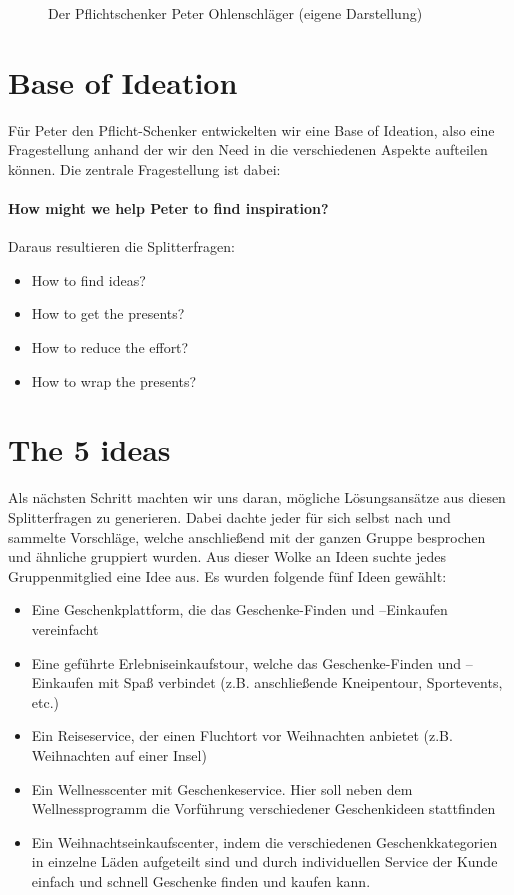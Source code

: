 \documentclass[12pt,ngerman, fleqn]{book} %
\begin{document}
\begin{figure}[ht]
    \centering
    \caption{Der Pflichtschenker Peter Ohlenschläger (eigene Darstellung)}
    \label{fig:peter}
\end{figure}

\section{Base of Ideation}
Für Peter den Pflicht-Schenker entwickelten wir eine Base of Ideation, also eine Fragestellung anhand der wir den Need in die verschiedenen Aspekte aufteilen können. Die zentrale Fragestellung ist dabei:

\paragraph{How might we help Peter to find inspiration?}

Daraus resultieren die Splitterfragen:
\begin{itemize}
    \item How to find ideas?
    \item How to get the presents?
    \item How to reduce the effort?
    \item How to wrap the presents?
\end{itemize}

\section{The 5 ideas}
Als nächsten Schritt machten wir uns daran, mögliche Lösungsansätze aus diesen Splitterfragen zu generieren. Dabei dachte jeder für sich selbst nach und sammelte Vorschläge, welche anschließend mit der ganzen Gruppe besprochen und ähnliche gruppiert wurden. Aus dieser Wolke an Ideen suchte jedes Gruppenmitglied eine Idee aus. Es wurden folgende fünf Ideen gewählt:

\begin{itemize}
    \item Eine Geschenkplattform, die das Geschenke-Finden und –Einkaufen vereinfacht
    \item Eine geführte Erlebniseinkaufstour, welche das Geschenke-Finden und –Einkaufen mit Spaß verbindet (z.B. anschließende Kneipentour, Sportevents, etc.)
    \item Ein Reiseservice, der einen Fluchtort vor Weihnachten anbietet (z.B. Weihnachten auf einer Insel)
    \item Ein Wellnesscenter mit Geschenkeservice. Hier soll neben dem Wellnessprogramm die Vorführung verschiedener Geschenkideen stattfinden
    \item Ein Weihnachtseinkaufscenter, indem die verschiedenen Geschenkkategorien in einzelne Läden aufgeteilt sind und durch individuellen Service der Kunde einfach und schnell Geschenke finden und kaufen kann.\\
\end{itemize}
\end{document}
